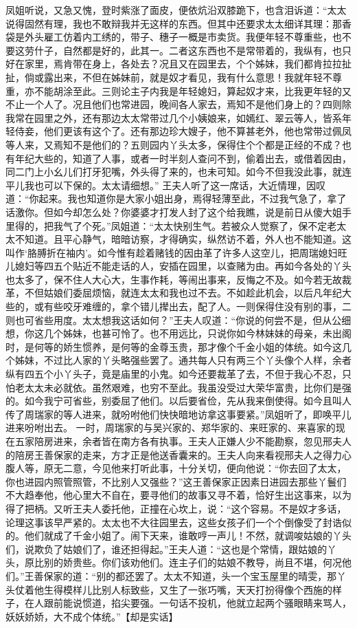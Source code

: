 \documentclass[12pt,oneside]{book}
\begin{document}
凤姐听说，又急又愧，登时紫涨了面皮，便依炕沿双膝跪下，也含泪诉道：“太太说得固然有理，我也不敢辩我并无这样的东西。但其中还要求太太细详其理：那香袋是外头雇工仿着内工绣的，带子、穗子一概是市卖货。我便年轻不尊重些，也不要这劳什子，自然都是好的，此其一。二者这东西也不是常带着的，我纵有，也只好在家里，焉肯带在身上，各处去？况且又在园里去，个个姊妹，我们都肯拉拉扯扯，倘或露出来，不但在姊妹前，就是奴才看见，我有什么意思！我就年轻不尊重，亦不能胡涂至此。三则论主子内我是年轻媳妇，算起奴才来，比我更年轻的又不止一个人了。况且他们也常进园，晚间各人家去，焉知不是他们身上的？四则除我常在园里之外，还有那边太太常带过几个小姨娘来，如嫣红、翠云等人，皆系年轻侍妾，他们更该有这个了。还有那边珍大嫂子，他不算甚老外，他也常带过佩凤等人来，又焉知不是他们的？五则园内丫头太多，保得住个个都是正经的不成？也有年纪大些的，知道了人事，或者一时半刻人查问不到，偷着出去，或借着因由，同二门上小幺儿们打牙犯嘴，外头得了来的，也未可知。如今不但我没此事，就连平儿我也可以下保的。太太请细想。”
王夫人听了这一席话，大近情理，因叹道：“你起来。我也知道你是大家小姐出身，焉得轻薄至此，不过我气急了，拿了话激你。但如今却怎么处？你婆婆才打发人封了这个给我瞧，说是前日从傻大姐手里得的，把我气了个死。”凤姐道：“太太快别生气。若被众人觉察了，保不定老太太不知道。且平心静气，暗暗访察，才得确实，纵然访不着，外人也不能知道。这叫作‘胳膊折在袖内’。如今惟有趁着赌钱的因由革了许多人这空儿，把周瑞媳妇旺儿媳妇等四五个贴近不能走话的人，安插在园里，以查赌为由。再如今各处的丫头也太多了，保不住人大心大，生事作耗，等闹出事来，反悔之不及。如今若无故裁革，不但姑娘们委屈烦恼，就连太太和我也过不去。不如趁此机会，以后凡年纪大些的，或有些咬牙难缠的，拿个错儿撵出去，配了人。一则保得住没有别的事，二则也可省些用度。太太想我这话如何？”王夫人叹道：“你说的何尝不是，但从公细想，你这几个姊妹，也甚可怜了。也不用远比，只说你如今林妹妹的母亲，未出阁时，是何等的娇生惯养，是何等的金尊玉贵，那才像个千金小姐的体统。如今这几个姊妹，不过比人家的丫头略强些罢了。通共每人只有两三个丫头像个人样，余者纵有四五个小丫头子，竟是庙里的小鬼。如今还要裁革了去，不但于我心不忍，只怕老太太未必就依。虽然艰难，也穷不至此。我虽没受过大荣华富贵，比你们是强的。如今我宁可省些，别委屈了他们。以后要省俭，先从我来倒使得。如今且叫人传了周瑞家的等人进来，就吩咐他们快快暗地访拿这事要紧。”凤姐听了，即唤平儿进来吩咐出去。
一时，周瑞家的与吴兴家的、郑华家的、来旺家的、来喜家的现在五家陪房进来，余者皆在南方各有执事。王夫人正嫌人少不能勘察，忽见邢夫人的陪房王善保家的走来，方才正是他送香囊来的。王夫人向来看视邢夫人之得力心腹人等，原无二意，今见他来打听此事，十分关切，便向他说：“你去回了太太，你也进园内照管照管，不比别人又强些？”这王善保家正因素日进园去那些丫鬟们不大趋奉他，他心里大不自在，要寻他们的故事又寻不着，恰好生出这事来，以为得了把柄。又听王夫人委托他，正撞在心坎上，说：“这个容易。不是奴才多话，论理这事该早严紧的。太太也不大往园里去，这些女孩子们一个个倒像受了封诰似的。他们就成了千金小姐了。闹下天来，谁敢哼一声儿！不然，就调唆姑娘的丫头们，说欺负了姑娘们了，谁还担得起。”王夫人道：“这也是个常情，跟姑娘的丫头，原比别的娇贵些。你们该劝他们。连主子们的姑娘不教导，尚且不堪，何况他们。”王善保家的道：“别的都还罢了。太太不知道，头一个宝玉屋里的晴雯，那丫头仗着他生得模样儿比别人标致些，又生了一张巧嘴，天天打扮得像个西施的样子，在人跟前能说惯道，掐尖要强。一句话不投机，他就立起两个骚眼睛来骂人，妖妖娇娇，大不成个体统。”【却是实话】
\end{document}
